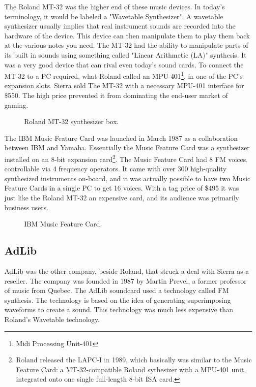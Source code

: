 \documentclass[book.tex]{subfiles}
\begin{document}
\par
The Roland MT-32 was the higher end of these music devices. In today's terminology, it would be labeled a "Wavetable Synthesizer". A wavetable synthesizer usually implies that real instrument sounds are recorded into the hardware of the device. This device can then manipulate them to play them back at the various notes you need. The MT-32 had the ability to manipulate parts of its built in sounds using something called "Linear Arithmetic (LA)" synthesis. It was a very good device that can rival even today's sound cards. To connect the MT-32 to a PC required, what Roland called an MPU-401\footnote{Midi Processing Unit-401}, in one of the PC's expansion slots. Sierra sold The MT-32 with a necessary MPU-401 interface for \$550. The high price prevented it from dominating the end-user market of gaming.\\

\par
  \begin{figure}[H] 
    \centering 
    \caption{Roland MT-32 synthesizer box.}
  \end{figure}


\par
The IBM Music Feature Card was launched in March 1987 as a collaboration between IBM and Yamaha. Essentially the Music Feature Card was a synthesizer installed on an 8-bit expansion card\footnote{Roland released the LAPC-I in 1989, which basically was similar to the Music Feature Card: a MT-32-compatible Roland sythesizer with a MPU-401 unit, integrated onto one single full-length 8-bit ISA card.}. The Music Feature Card had 8 FM voices, controllable via 4 frequency operators. It came with over 300 high-quality synthesized instruments on-board, and it was actually possible to have two Music Feature Cards in a single PC to get 16 voices. With a tag price of \$495 it was just like the Roland MT-32 an expensive card, and its audience was primarily business users.\\

\par
  \begin{figure}[H] 
    \centering 
    \caption{IBM Music Feature Card.}
  \end{figure}




 \subsection{AdLib}
AdLib was the other company, beside Roland, that struck a deal with Sierra as a reseller. The company was founded in 1987 by Martin Prevel, a former professor of music from Quebec. The AdLib soundcard used a technology called FM synthesis. The technology is based on the idea of generating superimposing waveforms to create a sound. This technology was much less expensive than Roland's Wavetable technology.\\
\end{document}
